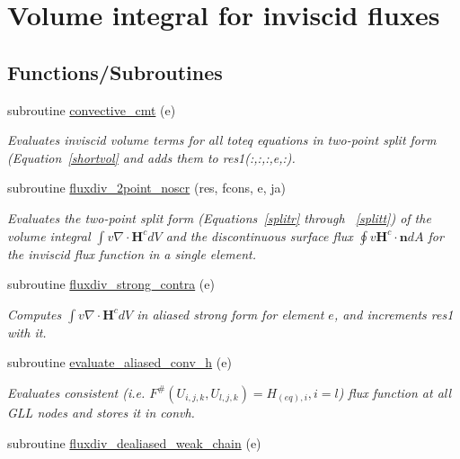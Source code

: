 \hypertarget{group__convhvol}{\section{Volume integral for inviscid fluxes}
\label{group__convhvol}
}
\subsection*{Functions/\-Subroutines}
\begin{DoxyCompactItemize}
\item 
subroutine \hyperlink{group__convhvol_ga77e7d7a46950fcbbf072e8e900cee272}{convective\-\_\-cmt} (e)
\begin{DoxyCompactList}\small\item\em Evaluates inviscid volume terms for all toteq equations in two-\/point split form (Equation~\ref{shortvol} and adds them to res1(\-:,\-:,\-:,e,\-:). \end{DoxyCompactList}\item 
subroutine \hyperlink{group__convhvol_ga72c1cbe51bc537e14ec8927e62f0e3f3}{fluxdiv\-\_\-2point\-\_\-noscr} (res, fcons, e, ja)
\begin{DoxyCompactList}\small\item\em Evaluates the two-\/point split form (Equations~\ref{splitr} through ~\ref{splitt}) of the volume integral $\int v \nabla\cdot\mathbf{H}^c dV$ and the discontinuous surface flux $\oint v \mathbf{H}^c\cdot\mathbf{n} dA$ for the inviscid flux function in a single element. \end{DoxyCompactList}\item 
subroutine \hyperlink{group__convhvol_gab4831bb28a78e1c8fd3ec09854bd15ad}{fluxdiv\-\_\-strong\-\_\-contra} (e)
\begin{DoxyCompactList}\small\item\em Computes $\int v \nabla\cdot\mathbf{H}^c dV$ in aliased strong form for element $e$, and increments res1 with it. \end{DoxyCompactList}\item 
subroutine \hyperlink{group__convhvol_gad9d70d83f1184d25495812d637698102}{evaluate\-\_\-aliased\-\_\-conv\-\_\-h} (e)
\begin{DoxyCompactList}\small\item\em Evaluates consistent (i.\-e. $F^{\#}(U_{i,j,k},U_{l,j,k})=H_{(eq),i},i=l$) flux function at all G\-L\-L nodes and stores it in convh. \end{DoxyCompactList}\item 
\hypertarget{group__convhvol_ga89ba8fe53f8afc523597773aca62a270}{subroutine \hyperlink{group__convhvol_ga89ba8fe53f8afc523597773aca62a270}{fluxdiv\-\_\-dealiased\-\_\-weak\-\_\-chain} (e)}\label{group__convhvol_ga89ba8fe53f8afc523597773aca62a270}


\end{DoxyCompactItemize}
